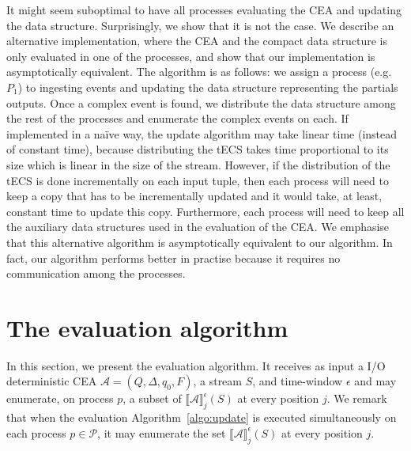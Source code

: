 It might seem suboptimal to have all processes evaluating the CEA and updating the data structure. Surprisingly, we show that it is not the case. We describe an alternative implementation, where the CEA and the compact data structure is only evaluated in one of the processes, and show that our implementation is asymptotically equivalent. The algorithm is as follows: we assign a process (e.g. $P_{1}$) to ingesting events and updating the data structure representing the partials outputs. Once a complex event is found, we distribute the data structure among the rest of the processes and enumerate the complex events on each. If implemented in a na\"ive way, the update algorithm may take linear time (instead of constant time), because distributing the tECS takes time proportional to its size which is linear in the size of the stream. However, if the distribution of the tECS is done incrementally on each input tuple, then each process will need to keep a copy that has to be incrementally updated and it would take, at least, constant time to update this copy. Furthermore, each process will need to keep all the auxiliary data structures used in the evaluation of the CEA. We emphasise that this alternative algorithm is asymptotically equivalent to our  algorithm. In fact, our algorithm performs better in practise because it requires no communication among the processes.


\section{The evaluation algorithm}\label{sec:evaluation}

In this section, we present the evaluation algorithm. It receives as input a I/O deterministic CEA ${\mathcal{A} = (Q, \Delta, q_{0}, F)}$, a stream $S$, and time-window $\epsilon$ and may enumerate, on process $p$, a subset of ${\llbracket \mathcal{A} \rrbracket}^{\epsilon}_{j}(S)$ at every position $j$. We remark that when the evaluation Algorithm~\ref{algo:update} is executed simultaneously on each process $p \in \mathcal{P}$, it may enumerate the set ${\llbracket \mathcal{A} \rrbracket}^{\epsilon}_{j}(S)$ at every position $j$.

